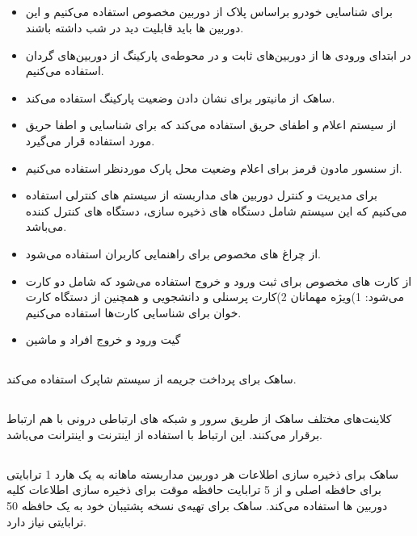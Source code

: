 \documentclass[oneside,a4paper,12pt]{book}
\begin{document}
	\subsection{}
	\begin{itemize}[label = --]
		\item\noindent
		برای شناسایی خودرو براساس پلاک از دوربین مخصوص استفاده می‌کنیم و این دوربین ها باید قابلیت دید در شب داشته باشند.
		\item\noindent
		در ابتدای ورودی ها از دوربین‌های ثابت و در محوطه‌ی پارکینگ از دوربین‌های گردان استفاده می‌کنیم.
		\item\noindent
		ساهک از مانیتور برای نشان دادن وضعیت پارکینگ استفاده می‌کند.
		\item\noindent
		از سیستم اعلام و اطفای حریق استفاده می‌کند که برای شناسایی و اطفا حریق مورد استفاده قرار می‌گیرد.
		\item\noindent
		از سنسور مادون قرمز برای اعلام وضعیت محل پارک موردنظر استفاده می‌کنیم.
		
		\item\noindent
		برای مدیریت و کنترل دوربین های مداربسته از سیستم های کنترلی استفاده می‌کنیم که این سیستم شامل دستگاه های ذخیره سازی، دستگاه های کنترل کننده می‌باشد.
		\item\noindent
		از چراغ های مخصوص برای راهنمایی کاربران استفاده می‌شود.
		\item\noindent
		از کارت های مخصوص برای ثبت ورود و خروج استفاده می‌شود که شامل دو کارت می‌شود: 1)ویژه مهمانان 2)کارت پرسنلی و دانشجویی و همچنین از دستگاه‌ کارت خوان برای شناسایی کارت‌ها استفاده می‌کنیم.
		
		\item\noindent
		گیت ورود و خروج افراد و ماشین
	\end{itemize}
	
	\subsection{}
	ساهک برای پرداخت جریمه از سیستم شاپرک استفاده می‌کند.
	
	\subsection{}
	کلاینت‌های مختلف ساهک از طریق سرور و شبکه های ارتباطی درونی با هم ارتباط برقرار می‌کنند. این ارتباط با استفاده از اینترنت و اینترانت می‌باشد.
	
	\subsection{}
	ساهک برای ذخیره سازی اطلاعات هر دوربین مداربسته ماهانه به یک هارد 1 ترابایتی برای حافظه اصلی و از 5 ترابایت حافظه موقت برای ذخیره سازی اطلاعات کلیه دوربین ها استفاده می‌کند. ساهک برای تهیه‌ی نسخه پشتیبان خود به یک حافظه 50 ترابایتی نیاز دارد.
	
\end{document}
